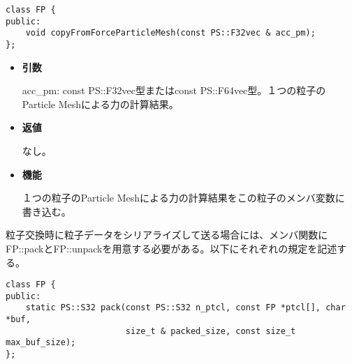 \begin{screen}
\begin{verbatim}
class FP {
public:
    void copyFromForceParticleMesh(const PS::F32vec & acc_pm);
};
\end{verbatim}
\end{screen}

\begin{itemize}

\item {\bf 引数}

  acc\_pm: const PS::F32vec型またはconst PS::F64vec型。１つの粒子の
  Particle Meshによる力の計算結果。

\item {\bf 返値}

  なし。
  
\item {\bf 機能}

  １つの粒子のParticle Meshによる力の計算結果をこの粒子のメンバ変数に
  書き込む。
  
\end{itemize}



\label{sec:FP:serialize}

粒子交換時に粒子データをシリアライズして送る場合には、メンバ関数に
FP::packとFP::unpackを用意する必要がある。以下にそれぞれの規定を記述す
る。



\begin{screen}
\begin{verbatim}
class FP {
public:
    static PS::S32 pack(const PS::S32 n_ptcl, const FP *ptcl[], char *buf, 
                        size_t & packed_size, const size_t max_buf_size);
};
\end{verbatim}
\end{screen}

